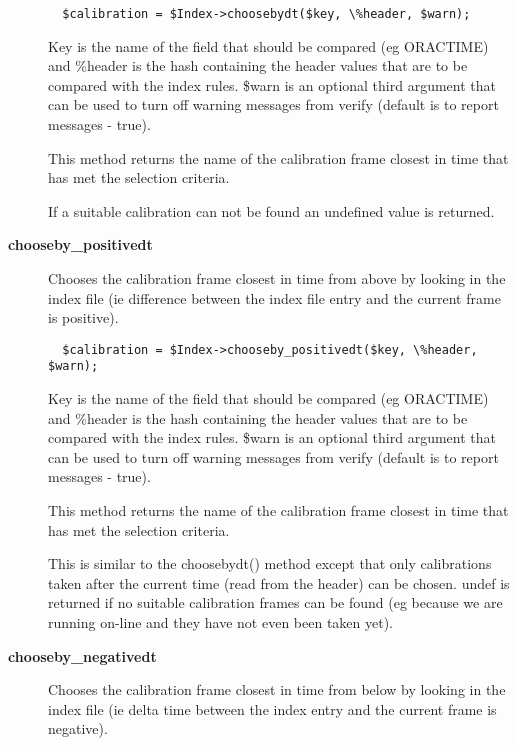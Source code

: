 \begin{description}
\begin{verbatim}
  $calibration = $Index->choosebydt($key, \%header, $warn);
\end{verbatim}


Key is the name of the field that should be compared (eg ORACTIME)
and \%header is the hash containing the header values that are to
be compared with the index rules. \$warn is an optional third argument
that can be used to turn off warning messages from verify (default
is to report messages - true).



This method returns the name of the calibration frame closest in 
time that has met the selection criteria.



If a suitable calibration can not be found an undefined value is returned.

\item[\textbf{chooseby\_positivedt}] \mbox{}

Chooses the calibration frame closest in time from above by looking 
in the index file (ie difference between the index file entry and
the current frame is positive).

\begin{verbatim}
  $calibration = $Index->chooseby_positivedt($key, \%header, $warn);
\end{verbatim}


Key is the name of the field that should be compared (eg ORACTIME)
and \%header is the hash containing the header values that are to
be compared with the index rules. \$warn is an optional third argument
that can be used to turn off warning messages from verify (default
is to report messages - true).



This method returns the name of the calibration frame closest in 
time that has met the selection criteria.



This is similar to the choosebydt() method except that only
calibrations taken after the current time (read from the
header) can be chosen. undef is returned if no suitable
calibration frames can be found (eg because we are running
on-line and they have not even been taken yet).

\item[\textbf{chooseby\_negativedt}] \mbox{}

Chooses the calibration frame closest in time from below by looking 
in the index file (ie delta time between the index entry and the 
current frame is negative).


\end{description}
